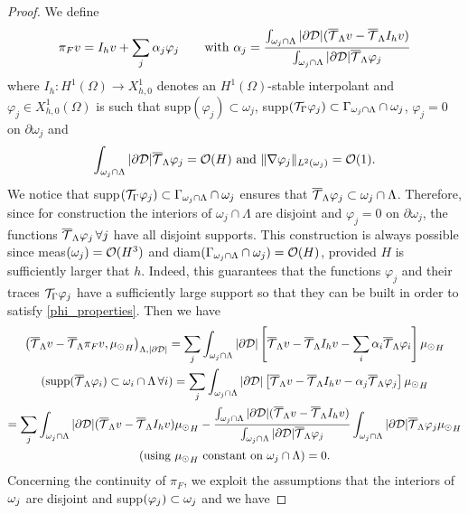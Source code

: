 \begin{proof}
We define
\begin{equation*}
\pi_F v = I_h v + \sum _j \alpha _j \varphi _j \qquad \text{with }\alpha_j =\frac{\int_{\omega _j \cap \Lambda}|\partial\mathcal{D}| ({\overline{\mathcal{T}}_\Lambda} v-{\overline{\mathcal{T}}_\Lambda} I_h v)}{\int_{\omega _j \cap \Lambda}|\partial\mathcal{D}|{\overline{\mathcal{T}}_\Lambda} \varphi _j}
\end{equation*}
where $I_h: H^1(\Omega) \rightarrow X_{h,0}^1$ denotes an $H^1(\Omega)$-stable interpolant
and $\varphi_j \in X_{h,0}^1(\Omega)$ is such that supp$(\varphi_j)\subset \omega_j$, supp$({\mathcal{T}_\Gamma} \varphi _j) \subset \Gamma_{\omega _j\cap \Lambda}\cap \omega_j$, $\varphi_j =0$ on $\partial \omega _j$ and 
\begin{equation}\label{phi_properties}
\int_{\patch\cap \Lambda}|\DD|\mtrace \varphi_j=\mathcal{O}(H) \text{ and } \|\nabla \varphi _j\|_{L^2(\omega _j)}=\mathcal{O}(1). 
\end{equation}
We notice that supp$({\mathcal{T}_\Gamma} \varphi_j) \subset \Gamma_{\omega _j\cap \Lambda}\cap \omega_j$ ensures that ${\overline{\mathcal{T}}_\Lambda} \varphi_j \subset \omega_j\cap \Lambda$. Therefore, since for construction the interiors of $\omega_j\cap \Lambda$  are disjoint and $\varphi _j = 0 $ on $\partial \omega_j$,  the functions ${\overline{\mathcal{T}}_\Lambda} \varphi_j\, \forall j$ have all disjoint supports. This construction is always possible since meas$(\omega _j) = \mathcal{O}(H^3)$ and diam$(\Gamma_{\omega _j\cap \Lambda} \cap \omega_j)=\mathcal{O}(H)$, provided $H$ is sufficiently larger that $h$. Indeed, this guarantees that the functions $\varphi _j$ and their traces ${\mathcal{T}_\Gamma} \varphi _j$ have a sufficiently large support so that they can be built in order to satisfy \eqref{phi_properties}.
Then we have
\begin{multline*}
\left({\overline{\mathcal{T}}_\Lambda} v - {\overline{\mathcal{T}}_\Lambda} \pi _F v  , {\mu_{\odot}}_H\right)_{\Lambda, |\partial\mathcal{D}|} = \sum _j \int_{\omega _j\cap \Lambda} |\partial\mathcal{D} |\left[ {\overline{\mathcal{T}}_\Lambda} v-{\overline{\mathcal{T}}_\Lambda} I_h v-\sum _i \alpha_i {\overline{\mathcal{T}}_\Lambda} \varphi _i \right]{\mu_{\odot}}_H \\
(\text{supp} ({\overline{\mathcal{T}}_\Lambda} \varphi _i )\subset \omega _i\cap \Lambda \, \forall i)  =\sum _j \int_{\omega _j\cap \Lambda}|\partial\mathcal{D}| \left[ {\overline{\mathcal{T}}_\Lambda} v-{\overline{\mathcal{T}}_\Lambda} I_h v-\alpha_j {\overline{\mathcal{T}}_\Lambda} \varphi _j \right]{\mu_{\odot}}_H\\
=\sum _j \int_{\omega _j\cap \Lambda} |\partial\mathcal{D}| ({\overline{\mathcal{T}}_\Lambda} v-{\overline{\mathcal{T}}_\Lambda}  I_h v) {\mu_{\odot}}_H - \frac{\int_{\omega _j\cap \Lambda} |\partial\mathcal{D}| ({\overline{\mathcal{T}}_\Lambda} v-{\overline{\mathcal{T}}_\Lambda} I_h v)}{\int_{\omega _j\cap \Lambda}|\partial\mathcal{D}|{\overline{\mathcal{T}}_\Lambda} \varphi _j} \int_{\omega _j\cap \Lambda} |\partial\mathcal{D}|{\overline{\mathcal{T}}_\Lambda} \varphi _j{\mu_{\odot}}_H\\ 
(\text{using ${\mu_{\odot}}_H$ constant on $\omega _j\cap \Lambda$})=0.
\end{multline*}
Concerning the continuity of $\pi_F$, we exploit the assumptions that the interiors of $\omega _j$ are disjoint and supp$(\varphi _j) \subset \omega _j$ and we have

\end{proof}

